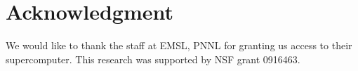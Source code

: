 \documentclass[10pt,journal,letterpaper,compsoc]{IEEEtran}
\begin{document}
\section*{Acknowledgment}
We would like to thank the staff at EMSL, PNNL for granting us access to their supercomputer. This research was supported by NSF grant 0916463.





%
%
%

\end{document}
